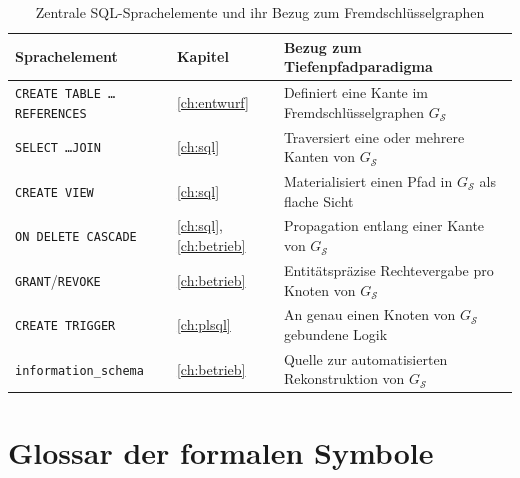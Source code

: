 ﻿\documentclass[a4paper,12pt]{report}
\theoremstyle{definition}
\theoremstyle{remark}
\begin{document}
\begin{table}[H]
\centering
\small
\begin{tabular}{@{}llp{6cm}@{}}
\toprule
\textbf{Sprachelement} & \textbf{Kapitel} & \textbf{Bezug zum Tiefenpfadparadigma} \\
\midrule
\texttt{CREATE TABLE \ldots REFERENCES} & \ref{ch:entwurf} &
  Definiert eine Kante im Fremdschlüsselgraphen $G_{\mathcal{S}}$ \\
\texttt{SELECT \ldots JOIN} & \ref{ch:sql} &
  Traversiert eine oder mehrere Kanten von $G_{\mathcal{S}}$ \\
\texttt{CREATE VIEW} & \ref{ch:sql} &
  Materialisiert einen Pfad in $G_{\mathcal{S}}$ als flache Sicht \\
\texttt{ON DELETE CASCADE} & \ref{ch:sql}, \ref{ch:betrieb} &
  Propagation entlang einer Kante von $G_{\mathcal{S}}$ \\
\texttt{GRANT}/\texttt{REVOKE} & \ref{ch:betrieb} &
  Entitätspräzise Rechtevergabe pro Knoten von $G_{\mathcal{S}}$ \\
\texttt{CREATE TRIGGER} & \ref{ch:plsql} &
  An genau einen Knoten von $G_{\mathcal{S}}$ gebundene Logik \\
\texttt{information\_schema} & \ref{ch:betrieb} &
  Quelle zur automatisierten Rekonstruktion von $G_{\mathcal{S}}$ \\
\bottomrule
\end{tabular}
\caption{Zentrale SQL-Sprachelemente und ihr Bezug zum Fremdschlüsselgraphen}
\label{tab:sql-uebersicht}
\end{table}

\section{Glossar der formalen Symbole}
\end{document}
